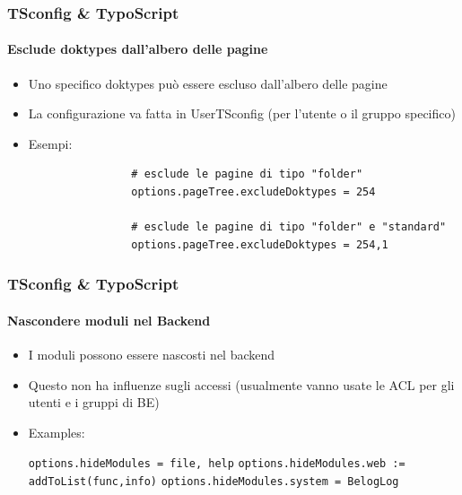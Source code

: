 
\begin{frame}[fragile]
	\frametitle{TSconfig \& TypoScript}
	\framesubtitle{Esclude doktypes dall'albero delle pagine}

	\begin{itemize}

		\item Uno specifico doktypes può essere escluso dall'albero delle pagine
		\item La configurazione va fatta in UserTSconfig (per l'utente o il gruppo specifico)
		\item Esempi:

			\begin{lstlisting}
				# esclude le pagine di tipo "folder"
				options.pageTree.excludeDoktypes = 254

				# esclude le pagine di tipo "folder" e "standard"
				options.pageTree.excludeDoktypes = 254,1
			\end{lstlisting}

	\end{itemize}

\end{frame}


\begin{frame}[fragile]
	\frametitle{TSconfig \& TypoScript}
	\framesubtitle{Nascondere moduli nel Backend}

	\begin{itemize}

		\item I moduli possono essere nascosti nel backend
		\item Questo non ha influenze sugli accessi\newline
			(usualmente vanno usate le ACL per gli utenti e i gruppi di BE)
		\item Examples:

			\lstinline!options.hideModules = file, help!
			\lstinline!options.hideModules.web := addToList(func,info)!
			\lstinline!options.hideModules.system = BelogLog!

	\end{itemize}

\end{frame}

